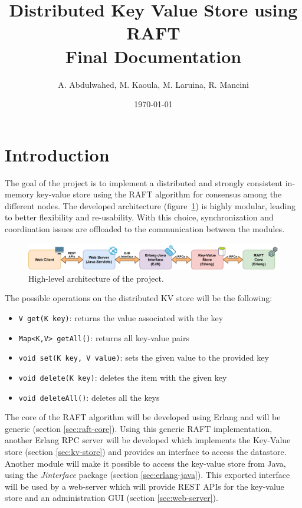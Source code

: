 \documentclass[a4paper]{article}
\author{A. Abdulwahed, M. Kaoula, M. Laruina, R. Mancini}
\title{Distributed Key Value Store using RAFT\\Final Documentation}
\date{\today}
\begin{document}
\maketitle
\vfill
\tableofcontents
\vfill
\clearpage
\setcounter{page}{1}

\section{Introduction}

The goal of the project is to implement a distributed and strongly 
consistent in-memory key-value store using the RAFT algorithm for consensus 
among the different nodes.
The developed architecture (figure~\ref{fig:raft-arch}) is highly modular, leading to better flexibility and 
re-usability. With this choice, synchronization and coordination issues are 
offloaded to the communication between the modules.

\begin{figure}[b]
    \includegraphics[width=\textwidth]{raft_architecture.pdf}
    \caption{High-level architecture of the project.}
    \label{fig:raft-arch}
\end{figure}

The possible operations on the distributed KV store will be the following:
\begin{itemize}
    \item \texttt{V get(K key)}: returns the value associated with the key
    \item \texttt{Map<K,V> getAll()}: returns all key-value pairs
    \item \texttt{void set(K key, V value)}: sets the given value to the 
        provided key
    \item \texttt{void delete(K key)}: deletes the item with the given key
    \item \texttt{void deleteAll()}: deletes all the keys
\end{itemize}

The core of the RAFT algorithm will be developed using Erlang and will be 
generic (section \ref{sec:raft-core}). Using this generic RAFT implementation, 
another Erlang RPC server will be developed which implements the Key-Value 
store (section \ref{sec:kv-store}) and provides an interface to access the 
datastore. Another module will make it possible to access the key-value 
store from Java, using the \emph{Jinterface} package 
(section \ref{sec:erlang-java}). 
This exported interface will be used by a web-server which will provide 
REST APIs for the key-value store and an administration GUI
(section \ref{sec:web-server}).
\end{document}
